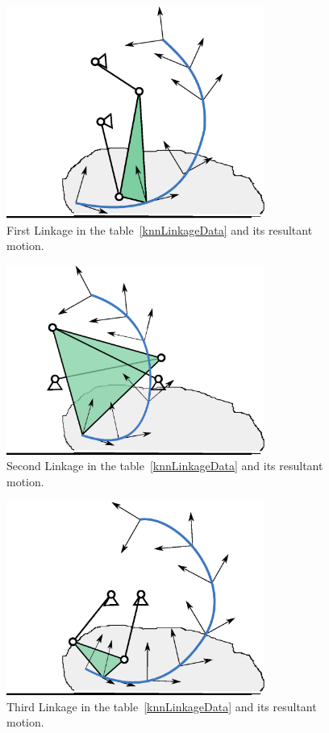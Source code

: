 \documentclass[twocolumn,10pt]{asme2e}
\begin{document}
\begin{figure}
\centering
\includegraphics[width=240pt]{figure/sol1.eps}
  \caption{First Linkage in the table~\ref{knnLinkageData} and its resultant motion.}
\label{knnSol1}
\end{figure}

\begin{figure}
\centering
\includegraphics[width=240pt]{figure/sol2.eps}
  \caption{Second Linkage in the table~\ref{knnLinkageData} and its resultant motion.}
\label{knnSol2}
\end{figure}

\begin{figure}
\centering
\includegraphics[width=240pt]{figure/sol3.eps}
  \caption{Third Linkage in the table~\ref{knnLinkageData} and its resultant motion.}
\label{knnSol3}
\end{figure}
\end{document}
